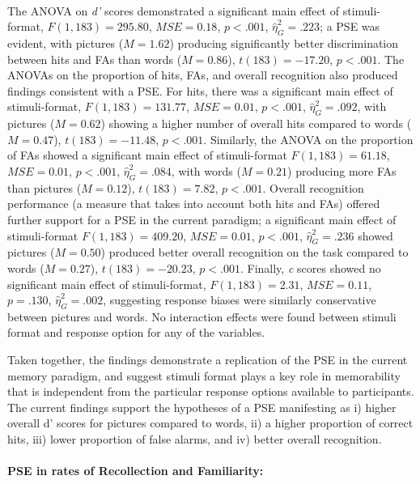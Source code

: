 \documentclass[
  11pt,
]{article}
\begin{document}
~ ~

The ANOVA on \emph{d'} scores demonstrated a significant main effect of
stimuli-format, \(F(1, 183) = 295.80\), \(\mathit{MSE} = 0.18\),
\(p < .001\), \(\hat{\eta}^2_G = .223\); a PSE was evident, with
pictures (\(M = 1.62\)) producing significantly better discrimination
between hits and FAs than words (\(M = 0.86\)), \(t(183) = -17.20\),
\(p < .001\). The ANOVAs on the proportion of hits, FAs, and overall
recognition also produced findings consistent with a PSE. For hits,
there was a significant main effect of stimuli-format,
\(F(1, 183) = 131.77\), \(\mathit{MSE} = 0.01\), \(p < .001\),
\(\hat{\eta}^2_G = .092\), with pictures (\(M = 0.62\)) showing a higher
number of overall hits compared to words (\(M = 0.47\)),
\(t(183) = -11.48\), \(p < .001\). Similarly, the ANOVA on the
proportion of FAs showed a significant main effect of stimuli-format
\(F(1, 183) = 61.18\), \(\mathit{MSE} = 0.01\), \(p < .001\),
\(\hat{\eta}^2_G = .084\), with words (\(M = 0.21\)) producing more FAs
than pictures (\(M = 0.12\)), \(t(183) = 7.82\), \(p < .001\). Overall
recognition performance (a measure that takes into account both hits and
FAs) offered further support for a PSE in the current paradigm; a
significant main effect of stimuli-format \(F(1, 183) = 409.20\),
\(\mathit{MSE} = 0.01\), \(p < .001\), \(\hat{\eta}^2_G = .236\) showed
pictures (\(M = 0.50\)) produced better overall recognition on the task
compared to words (\(M = 0.27\)), \(t(183) = -20.23\), \(p < .001\).
Finally, \emph{c} scores showed no significant main effect of
stimuli-format, \(F(1, 183) = 2.31\), \(\mathit{MSE} = 0.11\),
\(p = .130\), \(\hat{\eta}^2_G = .002\), suggesting response biases were
similarly conservative between pictures and words. No interaction
effects were found between stimuli format and response option for any of
the variables.

Taken together, the findings demonstrate a replication of the PSE in the
current memory paradigm, and suggest stimuli format plays a key role in
memorability that is independent from the particular response options
available to participants. The current findings support the hypotheses
of a PSE manifesting as i) higher overall d' scores for pictures
compared to words, ii) a higher proportion of correct hits, iii) lower
proportion of false alarms, and iv) better overall recognition.

\hypertarget{pse-in-rates-of-recollection-and-familiarity}{%
\paragraph{PSE in rates of Recollection and
Familiarity:}\label{pse-in-rates-of-recollection-and-familiarity}}
\end{document}
